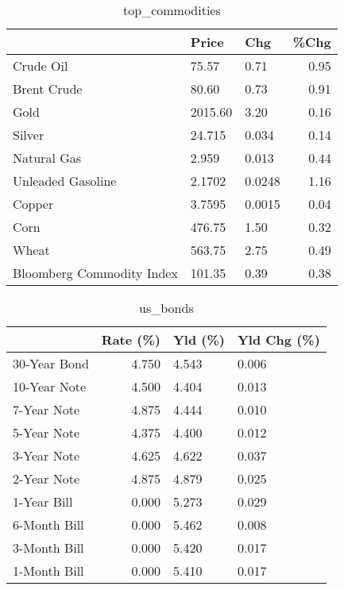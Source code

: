 \documentclass{article}%
\begin{document}
\begin{table}[htbp]%
\caption{top\_commodities}%
\centering%
\begin{adjustbox}{width=1\textwidth}%
\begin{tabular}{lllr}
\toprule
                          &   Price &    Chg &  \%Chg \\
\midrule
               Crude Oil  &   75.57 &   0.71 &  0.95 \\
             Brent Crude  &   80.60 &   0.73 &  0.91 \\
                    Gold  & 2015.60 &   3.20 &  0.16 \\
                  Silver  &  24.715 &  0.034 &  0.14 \\
             Natural Gas  &   2.959 &  0.013 &  0.44 \\
       Unleaded Gasoline  &  2.1702 & 0.0248 &  1.16 \\
                  Copper  &  3.7595 & 0.0015 &  0.04 \\
                    Corn  &  476.75 &   1.50 &  0.32 \\
                   Wheat  &  563.75 &   2.75 &  0.49 \\
Bloomberg Commodity Index &  101.35 &   0.39 &  0.38 \\
\bottomrule
\end{tabular}
%
\end{adjustbox}%
\end{table}

%


\begin{table}[htbp]%
\caption{us\_bonds}%
\centering%
\begin{adjustbox}{width=1\textwidth}%
\begin{tabular}{lrll}
\toprule
             &  Rate (\%) & Yld (\%) & Yld Chg (\%) \\
\midrule
30-Year Bond &     4.750 &   4.543 &       0.006 \\
10-Year Note &     4.500 &   4.404 &       0.013 \\
 7-Year Note &     4.875 &   4.444 &       0.010 \\
 5-Year Note &     4.375 &   4.400 &       0.012 \\
 3-Year Note &     4.625 &   4.622 &       0.037 \\
 2-Year Note &     4.875 &   4.879 &       0.025 \\
 1-Year Bill &     0.000 &   5.273 &       0.029 \\
6-Month Bill &     0.000 &   5.462 &       0.008 \\
3-Month Bill &     0.000 &   5.420 &       0.017 \\
1-Month Bill &     0.000 &   5.410 &       0.017 \\
\bottomrule
\end{tabular}
%
\end{adjustbox}%
\end{table}
\end{document}
